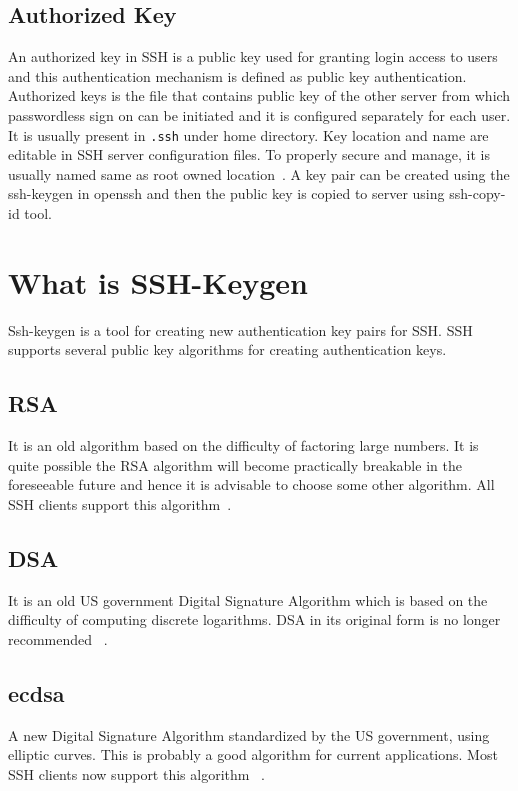 \subsection{Authorized Key}
An authorized key in SSH is a public key used for granting login access
to users and this authentication mechanism is defined as public key 
authentication. Authorized keys is the file that contains public 
key of the other server from which passwordless sign on can be 
initiated and it is configured separately for each user. It is 
usually present in \verb|.ssh| under home directory. Key 
location and name are editable in SSH server configuration 
files. To properly secure and manage, it is usually named same as 
root owned location~\cite{hid-sp18-513-sshkeyinc}.
A key pair can be created using the ssh-keygen in openssh and then
the public key is copied to server using ssh-copy-id tool.

\section{What is SSH-Keygen}
Ssh-keygen is a tool for creating new authentication key pairs 
for SSH. SSH supports several public key algorithms for creating
authentication keys. 

\subsection{RSA}
It is an old algorithm based on the difficulty of factoring large 
numbers. It is quite possible the RSA algorithm will become 
practically breakable in the foreseeable future and hence it is 
advisable to choose some other algorithm. All SSH clients support
this algorithm~\cite{hid-sp18-513-sshkeyinc}.

\subsection{DSA}
It is an old US government Digital Signature Algorithm which is
based on the difficulty of computing discrete logarithms. 
DSA in its original form is no longer recommended
~\cite{hid-sp18-513-sshkeyinc}.

\subsection{ecdsa}
A new Digital Signature Algorithm standardized by the US government,
using elliptic curves. This is probably a good algorithm for current
applications. Most SSH clients now support this algorithm
~\cite{hid-sp18-513-sshkeyinc}.

